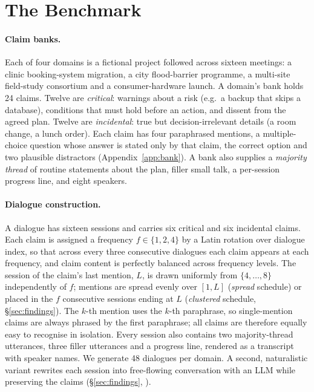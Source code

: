 \section{The \sys{} Benchmark}
\label{sec:benchmark}

\paragraph{Claim banks.}
Each of four domains is a fictional project followed across sixteen meetings: a clinic booking-system migration, a city flood-barrier programme, a multi-site field-study consortium and a consumer-hardware launch.
A domain's bank holds 24 claims.
Twelve are \emph{critical}: warnings about a risk (e.g.\ a backup that skips a database), conditions that must hold before an action, and dissent from the agreed plan.
Twelve are \emph{incidental}: true but decision-irrelevant details (a room change, a lunch order).
Each claim has four paraphrased mentions, a multiple-choice question whose answer is stated only by that claim, the correct option and two plausible distractors (Appendix~\ref{app:bank}).
A bank also supplies a \emph{majority thread} of routine statements about the plan, filler small talk, a per-session progress line, and eight speakers.

\paragraph{Dialogue construction.}
A dialogue has sixteen sessions and carries six critical and six incidental claims.
Each claim is assigned a frequency $f\in\{1,2,4\}$ by a Latin rotation over dialogue index, so that across every three consecutive dialogues each claim appears at each frequency, and claim content is perfectly balanced across frequency levels.
The session of the claim's last mention, $L$, is drawn uniformly from $\{4,\dots,8\}$ independently of $f$; mentions are spread evenly over $[1,L]$ (\emph{spread} schedule) or placed in the $f$ consecutive sessions ending at $L$ (\emph{clustered} schedule, \S\ref{sec:findings}).
The $k$-th mention uses the $k$-th paraphrase, so single-mention claims are always phrased by the first paraphrase; all claims are therefore equally easy to recognise in isolation.
Every session also contains two majority-thread utterances, three filler utterances and a progress line, rendered as a transcript with speaker names.
We generate 48 dialogues per domain.
A second, naturalistic variant rewrites each session into free-flowing conversation with an LLM while preserving the claims (\S\ref{sec:findings}, ).


